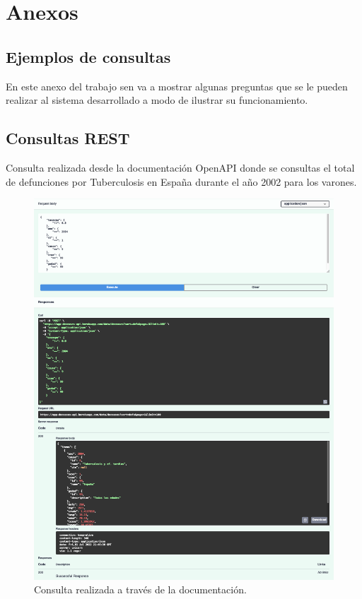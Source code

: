 \chapter{Anexos}

\section{Ejemplos de consultas} 
\label{sec:ejemplos}

En este anexo del trabajo sen va a mostrar algunas preguntas que se le pueden realizar al
sistema desarrollado a modo de ilustrar su
funcionamiento.

\section{Consultas REST}

Consulta realizada desde la documentación OpenAPI donde se consultas el total de defunciones
por Tuberculosis en España durante el año 2002 para los varones.
\FloatBarrier
\begin{figure}[h]
	\centering
	\includegraphics[width=\textwidth]{doc/logos/imgs/ejemplo1.png}
	\caption{ Consulta realizada a través de la documentación. }
\end{figure}
\FloatBarrier


